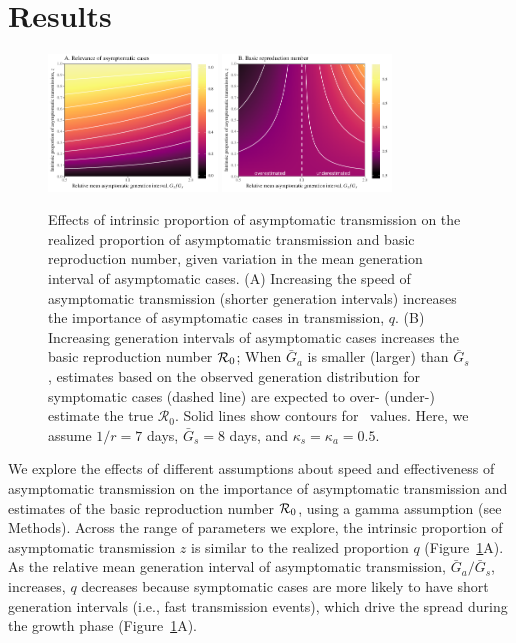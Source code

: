 \section{Results}

\begin{figure}[b!]
\begin{center}
\includegraphics[width=0.4\textwidth]{figheatmap.pdf}
\mbox{\hspace{0.05\textwidth}}
\includegraphics[width=0.4\textwidth]{figheatmap_R0.pdf}
\caption{Effects of intrinsic proportion of asymptomatic transmission on the realized proportion of asymptomatic transmission and basic reproduction number, given variation in
the mean generation interval of asymptomatic cases. 
(A) Increasing the speed of asymptomatic transmission (shorter generation intervals) increases the importance of asymptomatic cases in transmission, $q$.
(B) Increasing generation intervals of asymptomatic cases increases the basic reproduction number ${\cal{R}}_0$; 
When $\bar G_a$ is smaller (larger) than $\bar G_s$, estimates based on the observed generation distribution for symptomatic cases (dashed line) are expected to over- (under-) estimate the true $\mathcal R_0$.
Solid lines show contours for \Ro\ values. 
Here, we assume $1/r=7$ days, $\bar G_s=8$ days, and $\kappa_s=\kappa_a=0.5$.
\label{fig.importance}}
\end{center}
\end{figure}

We explore the effects of different assumptions about speed and effectiveness of asymptomatic transmission on the importance of asymptomatic transmission and estimates of the basic reproduction number ${\cal{R}}_0$, using a gamma assumption (see Methods).
Across the range of parameters we explore, the intrinsic proportion of asymptomatic transmission $z$ is similar to the realized proportion $q$ (Figure~\ref{fig.importance}A).
As the relative mean generation interval of asymptomatic transmission, $\bar G_a/\bar G_s$, increases, $q$ decreases because symptomatic cases are more likely to have short generation intervals (i.e., fast transmission events), which drive the spread during the growth phase (Figure~\ref{fig.importance}A).

